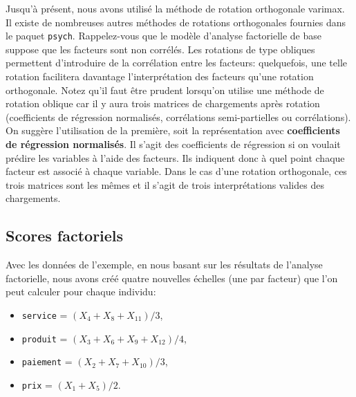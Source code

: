 \documentclass[
  11pt,
  letterpaper,
]{book}
\providecommand{\tightlist}{%
  \setlength{\itemsep}{0pt}\setlength{\parskip}{0pt}}\usepackage{longtable,booktabs,array}
\theoremstyle{definition}
\theoremstyle{remark}
\begin{document}
Jusqu'à présent, nous avons utilisé la méthode de rotation orthogonale
varimax. Il existe de nombreuses autres méthodes de rotations
orthogonales fournies dans le paquet \texttt{psych}. Rappelez-vous que
le modèle d'analyse factorielle de base suppose que les facteurs sont
non corrélés. Les rotations de type obliques permettent d'introduire de
la corrélation entre les facteurs: quelquefois, une telle rotation
facilitera davantage l'interprétation des facteurs qu'une rotation
orthogonale. Notez qu'il faut être prudent lorsqu'on utilise une méthode
de rotation oblique car il y aura trois matrices de chargements après
rotation (coefficients de régression normalisés, corrélations
semi-partielles ou corrélations). On suggère l'utilisation de la
première, soit la représentation avec \textbf{coefficients de régression
normalisés}. Il s'agit des coefficients de régression si on voulait
prédire les variables à l'aide des facteurs. Ils indiquent donc à quel
point chaque facteur est associé à chaque variable. Dans le cas d'une
rotation orthogonale, ces trois matrices sont les mêmes et il s'agit de
trois interprétations valides des chargements.

\hypertarget{scores-factoriels}{%
\subsection{Scores factoriels}\label{scores-factoriels}}

Avec les données de l'exemple, en nous basant sur les résultats de
l'analyse factorielle, nous avons créé quatre nouvelles échelles (une
par facteur) que l'on peut calculer pour chaque individu:

\begin{itemize}
\tightlist
\item
  \texttt{service} = \((X_4+X_8+X_{11})/3\),
\item
  \texttt{produit} = \((X_3+X_6+X_9+X_{12})/4\),
\item
  \texttt{paiement} = \((X_2+X_7+X_{10})/3\),
\item
  \texttt{prix} = \((X_1+X_5)/2\).
\end{itemize}
\end{document}
